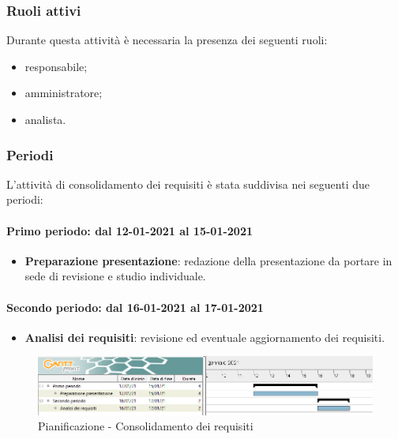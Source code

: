 \subsubsection{Ruoli attivi} 
Durante questa attività è necessaria la presenza dei seguenti ruoli: 
\begin{itemize} 
	\item responsabile; 
	\item amministratore; 
	\item analista. 
\end{itemize} 

\subsubsection{Periodi} 
L'attività di consolidamento dei requisiti è stata suddivisa nei seguenti due periodi: 

\paragraph{Primo periodo: dal 12-01-2021 al 15-01-2021} 
\begin{itemize} 
	
	\item \textbf{Preparazione presentazione}: redazione della presentazione da portare in sede di revisione e studio individuale. 
	
\end{itemize}	 

\paragraph{Secondo periodo: dal 16-01-2021 al 17-01-2021} 
\begin{itemize} 
	
	\item \textbf{Analisi dei requisiti}: revisione ed eventuale aggiornamento dei requisiti. 
	
\end{itemize} 

\newpage 

\begin{landscape} 
	\begin{figure}[h!] 
		\includegraphics[width=24cm]{images/2_Consolidamento_dei_requisiti.png} 
		\caption{Pianificazione - Consolidamento dei requisiti} 
	\end{figure} 
\end{landscape} 

